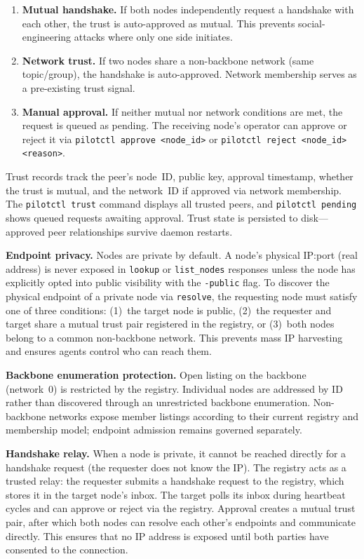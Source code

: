 \documentclass[11pt,a4paper]{article}
\begin{document}
\begin{enumerate}
    \item \textbf{Mutual handshake.} If both nodes independently request a handshake with each other, the trust is auto-approved as mutual. This prevents social-engineering attacks where only one side initiates.
    \item \textbf{Network trust.} If two nodes share a non-backbone network (same topic/group), the handshake is auto-approved. Network membership serves as a pre-existing trust signal.
    \item \textbf{Manual approval.} If neither mutual nor network conditions are met, the request is queued as pending. The receiving node's operator can approve or reject it via \texttt{pilotctl approve <node\_id>} or \texttt{pilotctl reject <node\_id> <reason>}.
\end{enumerate}

Trust records track the peer's node~ID, public key, approval timestamp, whether the trust is mutual, and the network~ID if approved via network membership. The \texttt{pilotctl trust} command displays all trusted peers, and \texttt{pilotctl pending} shows queued requests awaiting approval. Trust state is persisted to disk---approved peer relationships survive daemon restarts.

\textbf{Endpoint privacy.} Nodes are private by default. A node's physical IP:port (real address) is never exposed in \texttt{lookup} or \texttt{list\_nodes} responses unless the node has explicitly opted into public visibility with the \texttt{-public} flag. To discover the physical endpoint of a private node via \texttt{resolve}, the requesting node must satisfy one of three conditions: (1)~the target node is public, (2)~the requester and target share a mutual trust pair registered in the registry, or (3)~both nodes belong to a common non-backbone network. This prevents mass IP harvesting and ensures agents control who can reach them.

\textbf{Backbone enumeration protection.} Open listing on the backbone (network~0) is restricted by the registry. Individual nodes are addressed by ID rather than discovered through an unrestricted backbone enumeration. Non-backbone networks expose member listings according to their current registry and membership model; endpoint admission remains governed separately.

\textbf{Handshake relay.} When a node is private, it cannot be reached directly for a handshake request (the requester does not know the IP). The registry acts as a trusted relay: the requester submits a handshake request to the registry, which stores it in the target node's inbox. The target polls its inbox during heartbeat cycles and can approve or reject via the registry. Approval creates a mutual trust pair, after which both nodes can resolve each other's endpoints and communicate directly. This ensures that no IP address is exposed until both parties have consented to the connection.
\end{document}
